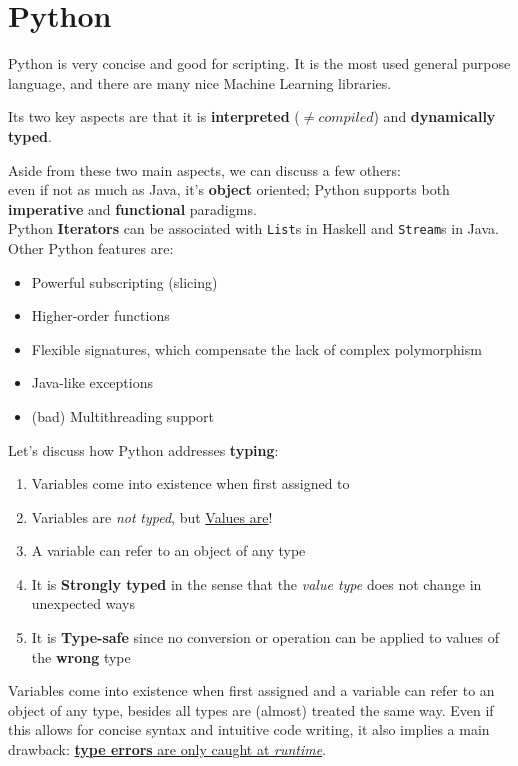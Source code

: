\chapter{Python}
Python is very concise and good for scripting.
It is the most used general purpose language, and there are many nice Machine Learning libraries.

Its two key aspects are that it is \textbf{interpreted} ($\neq compiled$) and \textbf{dynamically typed}.

Aside from these two main aspects, we can discuss a few others:\\
even if not as much as Java, it's \textbf{object} oriented;
Python supports both \textbf{imperative} and \textbf{functional} paradigms.\\
Python \textbf{Iterators} can be associated with \texttt{List}s in Haskell and \texttt{Stream}s in Java.
Other Python features are:
\begin{itemize}
   \item Powerful subscripting (slicing)
   \item Higher-order functions
   \item Flexible signatures, which compensate the lack of complex polymorphism
   \item Java-like exceptions
   \item (bad) Multithreading support
\end{itemize}

Let's discuss how Python addresses \textbf{typing}:
\begin{enumerate}
   \item Variables come into existence when first assigned to
   \item Variables are \textit{not} \textit{typed}, but \underline{Values are}!
   \item A variable can refer to an object of any type
   \item It is \textbf{Strongly typed} in the sense that the \textit{value type} does not change in unexpected ways
   \item It is \textbf{Type-safe} since no conversion or operation can be applied to values of the \textbf{wrong} type
\end{enumerate}


Variables come into existence when first assigned and a variable can refer to an object of any type,
besides all types are (almost) treated the same way.
Even if this allows for concise syntax and intuitive code writing, it also implies a main drawback: \underline{\textbf{type errors} are only caught at \textit{runtime}}.

